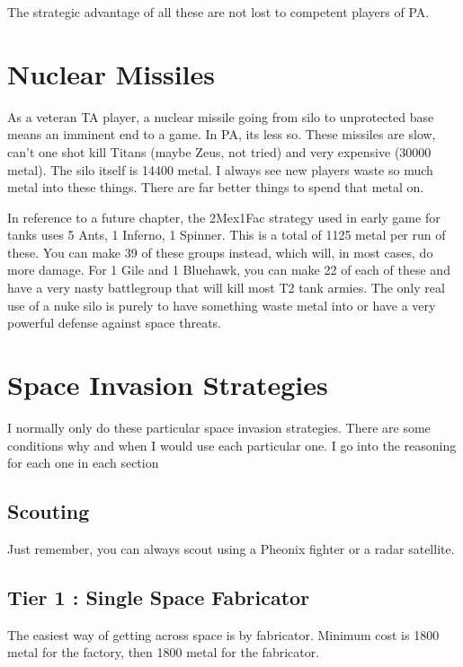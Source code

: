\documentclass[]{article}
\begin{document}
The strategic advantage of all these are not lost to competent players of PA.  

\newpage
\section{Nuclear Missiles}

As a veteran TA player, a nuclear missile going from silo to unprotected base means an imminent end to a game.  In PA, its less so.  These missiles are slow, can't one shot kill Titans (maybe Zeus, not tried)  and very expensive (30000 metal).  The silo itself is 14400 metal.  I always see new players waste so much metal into these things.  There are far better things to spend that metal on.  

In reference to a future chapter, the 2Mex1Fac strategy used in early game for tanks uses 5 Ants, 1 Inferno, 1 Spinner.  This is a total of 1125 metal per run of these.  You can make 39 of these groups instead, which will, in most cases, do more damage.  For 1 Gile and 1 Bluehawk, you can make 22 of each of these and have a very nasty battlegroup that will kill most T2 tank armies.  The only real use of a nuke silo is purely to have something waste metal into or have a very powerful defense against space threats.  


\newpage




\section{Space Invasion Strategies}

I normally only do these particular space invasion strategies.  There are some conditions why and when I would use each particular one.  I go into the reasoning for each one in each section

\subsection{Scouting}

Just remember, you can always scout using a Pheonix fighter or a radar satellite.  


\subsection{Tier 1 : Single Space Fabricator}

The easiest way of getting across space is by fabricator.  Minimum cost is 1800 metal for the factory, then 1800 metal for the fabricator.  
\end{document}
